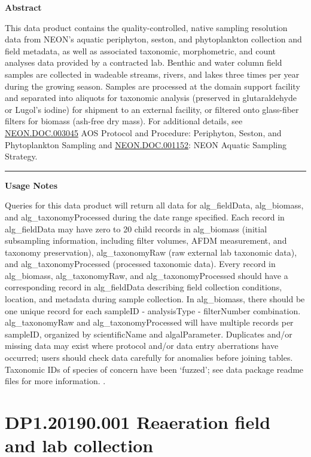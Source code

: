 \documentclass[]{article}
\begin{document}
\textbf{Abstract}

This data product contains the quality-controlled, native sampling
resolution data from NEON's aquatic periphyton, seston, and
phytoplankton collection and field metadata, as well as associated
taxonomic, morphometric, and count analyses data provided by a
contracted lab. Benthic and water column field samples are collected in
wadeable streams, rivers, and lakes three times per year during the
growing season. Samples are processed at the domain support facility and
separated into aliquots for taxonomic analysis (preserved in
glutaraldehyde or Lugol's iodine) for shipment to an external facility,
or filtered onto glass-fiber filters for biomass (ash-free dry mass).
For additional details, see
\href{http://data.neonscience.org/api/v0/documents/NEON.DOC.003045vB}{NEON.DOC.003045}
AOS Protocol and Procedure: Periphyton, Seston, and Phytoplankton
Sampling and
\href{http://data.neonscience.org/api/v0/documents/NEON.DOC.001152vA}{NEON.DOC.001152}:
NEON Aquatic Sampling Strategy.

\begin{center}\rule{0.5\linewidth}{\linethickness}\end{center}

\textbf{Usage Notes}

Queries for this data product will return all data for alg\_fieldData,
alg\_biomass, and alg\_taxonomyProcessed during the date range
specified. Each record in alg\_fieldData may have zero to 20 child
records in alg\_biomass (initial subsampling information, including
filter volumes, AFDM measurement, and taxonomy preservation),
alg\_taxonomyRaw (raw external lab taxonomic data), and
alg\_taxonomyProcessed (processed taxonomic data). Every record in
alg\_biomass, alg\_taxonomyRaw, and alg\_taxonomyProcessed should have a
corresponding record in alg\_fieldData describing field collection
conditions, location, and metadata during sample collection. In
alg\_biomass, there should be one unique record for each sampleID -
analysisType - filterNumber combination. alg\_taxonomyRaw and
alg\_taxonomyProcessed will have multiple records per sampleID,
organized by scientificName and algalParameter. Duplicates and/or
missing data may exist where protocol and/or data entry aberrations have
occurred; users should check data carefully for anomalies before joining
tables. Taxonomic IDs of species of concern have been `fuzzed'; see data
package readme files for more information. \newpage
.

\section{DP1.20190.001 Reaeration field and lab
collection}\label{dp1.20190.001-reaeration-field-and-lab-collection}
\end{document}
